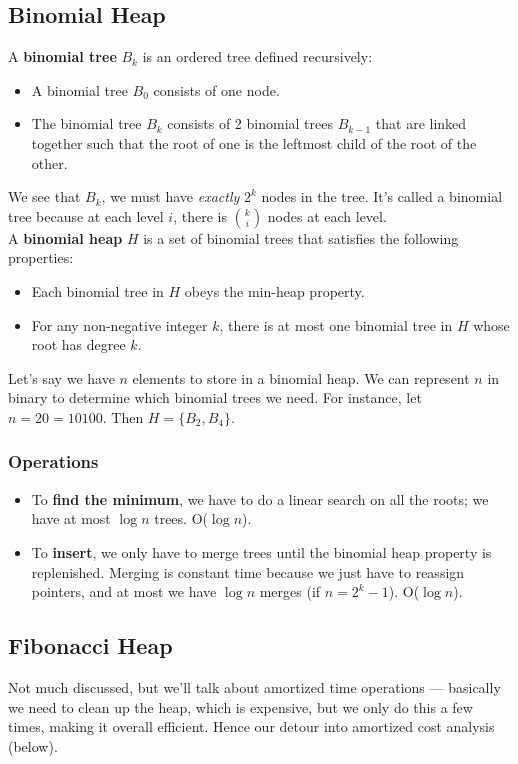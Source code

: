 \documentclass[11pt]{article}
\begin{document}
\subsection{Binomial Heap}
\begin{tcolorbox}
A \textbf{binomial tree} $B_k$ is an ordered tree defined recursively:
\begin{itemize}
    \item A binomial tree $B_0$ consists of one node.
    \item The binomial tree $B_k$ consists of 2 binomial trees $B_{k-1}$ that are linked together such that the root of one is the leftmost child of the root of the other.
\end{itemize}

We see that $B_k$, we must have \textit{exactly} $2^k$ nodes in the tree. It's called a binomial tree because at each level $i$, there is $\binom{k}{i}$ nodes at each level. \\[0.5em]
A \textbf{binomial heap} $H$ is a set of binomial trees that satisfies the following properties:
\begin{itemize}
    \item Each binomial tree in $H$ obeys the min-heap property.
    \item For any non-negative integer $k$, there is at most one binomial tree in $H$ whose root has degree $k$.
\end{itemize}
\end{tcolorbox}

Let's say we have $n$ elements to store in a binomial heap. We can represent $n$ in binary to determine which binomial trees we need. For instance, let $n = 20 = 10100$. Then $H = \{B_2, B_4\}$.

\subsubsection{Operations}
\begin{itemize}
    \item To \textbf{find the minimum}, we have to do a linear search on all the roots; we have at most $\log n$ trees. O($\log n$).
    \item To \textbf{insert}, we only have to merge trees until the binomial heap property is replenished. Merging is constant time because we just have to reassign pointers, and at most we have $\log n$ merges (if $n = 2^k-1$). O($\log n$).
\end{itemize}

\subsection{Fibonacci Heap}
Not much discussed, but we'll talk about amortized time operations --- basically we need to clean up the heap, which is expensive, but we only do this a few times, making it overall efficient. Hence our detour into amortized cost analysis (below).
\end{document}
